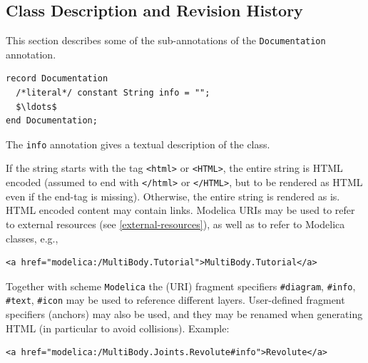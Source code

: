 \subsection{Class Description and Revision History}\label{annotation-info-revisions}

This section describes some of the sub-annotations of the \lstinline!Documentation! annotation.

\begin{annotationdefinition*}[info]\label{modelica:Documentation.info}
\begin{synopsis}\begin{lstlisting}
record Documentation
  /*literal*/ constant String info = "";
  $\ldots$
end Documentation;
\end{lstlisting}\end{synopsis}
\begin{semantics}
The \lstinline!info! annotation gives a textual description of the class.

If the string starts with the tag \lstinline!<html>! or \lstinline!<HTML>!, the entire string is HTML encoded (assumed to end with \lstinline!</html>! or \lstinline!</HTML>!, but to be rendered as HTML even if the end-tag is missing).
Otherwise, the entire string is rendered as is.
HTML encoded content may contain links.
Modelica URIs may be used to refer to external resources (see \cref{external-resources}), as well as to refer to Modelica classes, e.g.,
\begin{lstlisting}[language=modelica]
<a href="modelica:/MultiBody.Tutorial">MultiBody.Tutorial</a>
\end{lstlisting}

Together with scheme \lstinline!Modelica! the (URI) fragment specifiers \lstinline!#diagram!, \lstinline!#info!, \lstinline!#text!, \lstinline!#icon! may be used to reference different layers.
User-defined fragment specifiers (anchors) may also be used, and they may be renamed when generating HTML (in particular to avoid collisions).
Example:
\begin{lstlisting}[language=modelica]
<a href="modelica:/MultiBody.Joints.Revolute#info">Revolute</a>
\end{lstlisting}
\end{semantics}
\end{annotationdefinition*}

